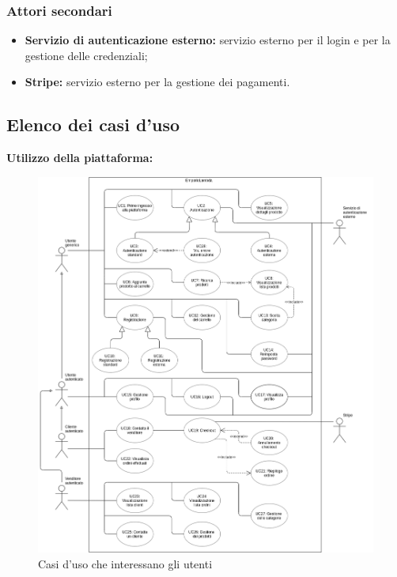 \begin{itemize}
\begin{itemize}
\begin{figure}[!ht]
                        \centering
                    \end{figure}
          \end{itemize}
\end{itemize}
\subsubsection{Attori secondari}
\begin{itemize}
    \item \textbf{Servizio di autenticazione esterno:} servizio esterno per il login e per la gestione delle credenziali;
    \item \textbf{Stripe:} servizio esterno per la gestione dei pagamenti.
\end{itemize}
\newpage
\subsection{Elenco dei casi d'uso}
\textbf{Utilizzo della piattaforma:}
\vspace{-10px}
\begin{figure}[!ht]
    \caption{Casi d'uso che interessano gli utenti}
    \vspace{10px}
    \includegraphics[scale=0.42]{../../../Images/AnalisiRequisiti/casiUso}
    \centering
\end{figure}
